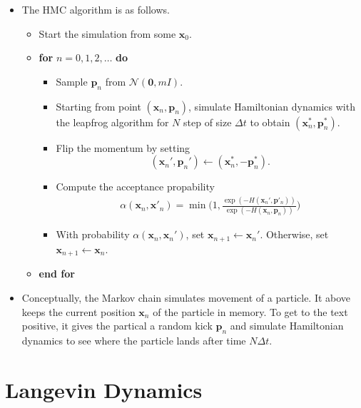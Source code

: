\documentclass[10pt]{article}
\newcommand{\ve}[1]{\mathbf{#1}}
\newcommand{\mcal}[1]{\mathcal{#1}}
\begin{document}
\begin{itemize}
  \item The HMC algorithm is as follows.
  \begin{itemize}
    \item Start the simulation from some $\ve{x}_0$.
    
    \item {\bf for} $n = 0, 1, 2, \dotsc$ {\bf do}
    
    \begin{itemize}
      \item Sample $\ve{p}_n$ from $\mcal{N}(\ve{0}, mI)$.
      
      \item Starting from point $(\ve{x}_n, \ve{p}_n)$, simulate Hamiltonian dynamics with the leapfrog algorithm for $N$ step of size $\Delta t$ to obtain $(\ve{x}_n^*, \ve{p}^*_n)$.
      
      \item Flip the momentum by setting $$(\ve{x}_n', \ve{p}_n') \gets (\ve{x}_n^*, -\ve{p}_n^*).$$      
      
      \item Compute the acceptance propability 
      \begin{align*} 
        \alpha(\ve{x}_n, \ve{x}'_n) = \min\bigg(1 , \frac{\exp(-H(\ve{x}_n', \ve{p}'_n))}{\exp(-H(\ve{x}_n, \ve{p}_n))} \bigg)
      \end{align*}      
      
      \item With probability $\alpha(\ve{x}_n, \ve{x}_n')$, set $\ve{x}_{n+1} \gets \ve{x}_n'$. Otherwise, set $\ve{x}_{n+1} \gets \ve{x}_n$.
    \end{itemize}

    \item[] {\bf end for}
  \end{itemize}

  \item Conceptually, the Markov chain simulates movement of a particle. It above keeps the current position $\ve{x}_n$ of the particle in memory. To get to the text positive, it gives the partical a random kick $\ve{p}_n$ and simulate Hamiltonian dynamics to see where the particle lands after time $N\Delta t$.
\end{itemize}

\section{Langevin Dynamics}
\end{document}
